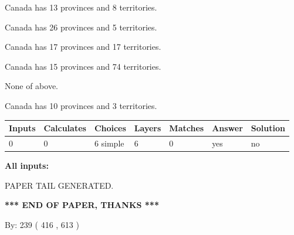 \documentclass[12pt]{article}
\begin{document}
 
Canada has  13 provinces and  8 territories.
 
 
Canada has  26 provinces and  5 territories.
 
 
Canada has  17 provinces and  17 territories.
 
 
Canada has  15 provinces and  74 territories.
 
 
 None of above.
 
 
\noindent{}
 
 
Canada has 10  provinces and 3 territories.
 
 
\noindent{}
 
 
   
   
   
   
\noindent\begin{tabular}{|l|l|l|l|l|l|l|}
 \hline
Inputs & Calculates & Choices & Layers & Matches & Answer & Solution \\ \hline
 0  & 
 0  & 
 6
  simple  
  & 
 6  & 
 0  & 
  yes & 
  no 
  \\ \hline
 \end{tabular}
   
   
   
   
\noindent{}
   
   
   
   
\noindent\vspace{0.1in}\hspace{-0.08in} {\textbf{\Large{All inputs: }}}
   
   
   
   
   
   
 \vspace{0.2in}
 
   
   
\vspace{2.0in} PAPER TAIL GENERATED.
   
   
   
   
\vspace{1.0in} 
{\textbf{\large{ *** END OF PAPER, THANKS *** }}} 
   
   
\hspace{1.0in} By: 
 239 ( 416 ,  613 )
   
\end{document}
